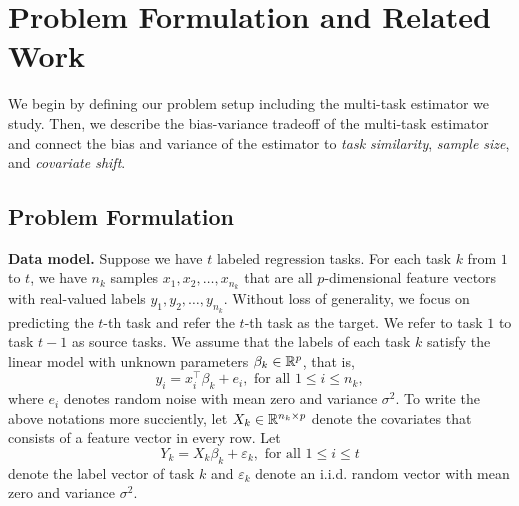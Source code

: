 \section{Problem Formulation and Related Work}
\label{sec_prelim}

We begin by defining our problem setup including the multi-task estimator we study.
Then, we describe the bias-variance tradeoff of the multi-task estimator and connect the bias and variance of the estimator to \textit{task similarity}, \textit{sample size}, and \textit{covariate shift}.

\subsection{Problem Formulation}


\noindent\textbf{Data model.}
Suppose we have $t$ labeled regression tasks. %
For each task $k$ from $1$ to $t$, we have $n_k$ samples $x_1, x_2, \dots, x_{n_k}$ that are all $p$-dimensional feature vectors with real-valued labels $y_1, y_2, \dots, y_{n_k}$.
Without loss of generality, we focus on predicting the $t$-th task and refer the $t$-th task as the target.
We refer to task $1$ to task $t-1$ as source tasks.
We assume that the labels of each task $k$ satisfy the linear model with unknown parameters $\beta_k\in\mathbb{R}^p$, that is,
	\[ y_i = x_i^{\top}\beta_k + e_i, \text{ for all } 1 \le i \le n_k, \]
where $e_i$ denotes random noise with mean zero and variance $\sigma^2$.
To write the above notations more succiently, let $X_k \in \mathbb{R}^{n_k \times p}$ denote the covariates that consists of a feature vector in every row.
Let
	\[ Y_k = X_k \beta_k + \varepsilon_k, \text{ for all } 1\le i \le t \] denote the label vector of task $k$ and $\varepsilon_k$ denote an i.i.d. random vector with mean zero and variance $\sigma^2$.

